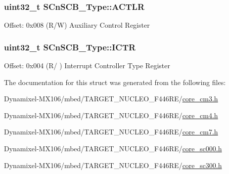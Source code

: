 \subsubsection[{\texorpdfstring{A\+C\+T\+LR}{ACTLR}}]{ uint32\+\_\+t S\+Cn\+S\+C\+B\+\_\+\+Type\+::\+A\+C\+T\+LR}\hypertarget{struct_s_cn_s_c_b___type_aacadedade30422fed705e8dfc8e6cd8d}{}\label{struct_s_cn_s_c_b___type_aacadedade30422fed705e8dfc8e6cd8d}
Offset\+: 0x008 (R/W) Auxiliary Control Register 
\subsubsection[{\texorpdfstring{I\+C\+TR}{ICTR}}]{ uint32\+\_\+t S\+Cn\+S\+C\+B\+\_\+\+Type\+::\+I\+C\+TR}\hypertarget{struct_s_cn_s_c_b___type_ad99a25f5d4c163d9005ca607c24f6a98}{}\label{struct_s_cn_s_c_b___type_ad99a25f5d4c163d9005ca607c24f6a98}
Offset\+: 0x004 (R/ ) Interrupt Controller Type Register 

The documentation for this struct was generated from the following files\+:\begin{DoxyCompactItemize}
\item 
Dynamixel-\/\+M\+X106/mbed/\+T\+A\+R\+G\+E\+T\+\_\+\+N\+U\+C\+L\+E\+O\+\_\+\+F446\+R\+E/\hyperlink{core__cm3_8h}{core\+\_\+cm3.\+h}\item 
Dynamixel-\/\+M\+X106/mbed/\+T\+A\+R\+G\+E\+T\+\_\+\+N\+U\+C\+L\+E\+O\+\_\+\+F446\+R\+E/\hyperlink{core__cm4_8h}{core\+\_\+cm4.\+h}\item 
Dynamixel-\/\+M\+X106/mbed/\+T\+A\+R\+G\+E\+T\+\_\+\+N\+U\+C\+L\+E\+O\+\_\+\+F446\+R\+E/\hyperlink{core__cm7_8h}{core\+\_\+cm7.\+h}\item 
Dynamixel-\/\+M\+X106/mbed/\+T\+A\+R\+G\+E\+T\+\_\+\+N\+U\+C\+L\+E\+O\+\_\+\+F446\+R\+E/\hyperlink{core__sc000_8h}{core\+\_\+sc000.\+h}\item 
Dynamixel-\/\+M\+X106/mbed/\+T\+A\+R\+G\+E\+T\+\_\+\+N\+U\+C\+L\+E\+O\+\_\+\+F446\+R\+E/\hyperlink{core__sc300_8h}{core\+\_\+sc300.\+h}\end{DoxyCompactItemize}
